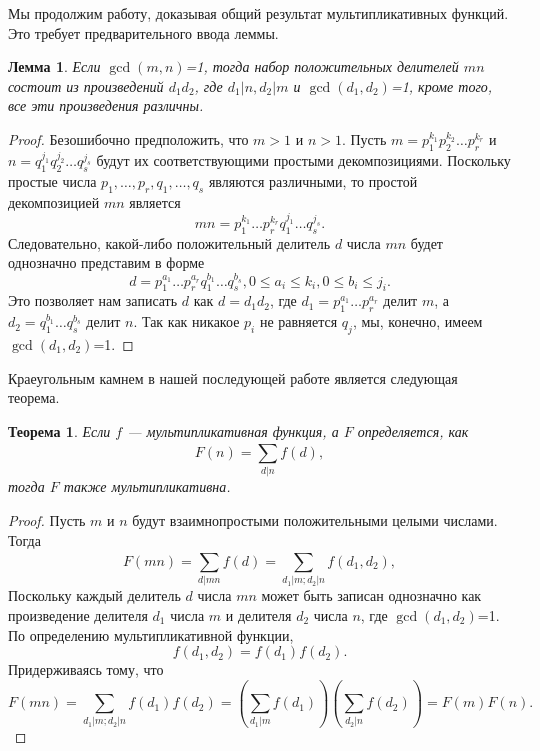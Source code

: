 \documentclass[11pt]{article}
\newtheorem{theorem}{Теорема}
\newtheorem{lemma}{Лемма}
\begin{document}
	Мы продолжим работу, доказывая общий результат мультипликативных функций. Это требует предварительного ввода леммы.
	
	\begin{lemma}
		Если $\gcd(m,n)$=1, тогда набор положительных делителей $mn$ состоит из произведений $d_1d_2$, где $d_1|n,d_2|m$ и $\gcd(d_1,d_2)$=1, кроме того, все эти произведения различны.
	\end{lemma}

	\begin{proof}
		Безошибочно предположить, что $m>1$ и $n>1$. Пусть $m=p_1^{k_1}p_2^{k_2}\ldots p_r^{k_r}$ и  $n=q_1^{j_1}q_2^{j_2}\ldots q_s^{j_s}$ будут их соответствующими простыми декомпозициями. Поскольку простые числа $p_1,\ldots,p_r,q_1,\ldots,q_s$ являются различными, то простой декомпозицией $mn$ является  
		\[
			mn=p_1^{k_1}\ldots p_r^{k_r}q_1^{j_1}\ldots q_s^{j_s}.
		\]
		Следовательно, какой-либо положительный делитель $d$ числа $mn$ будет однозначно представим в форме
		\[
			d=p_1^{a_1}\ldots p_r^{a_r}q_1^{b_1}\ldots q_s^{b_s}, 0\le a_i \le k_i, 0\le b_i\le j_i.
		\]
		Это позволяет нам записать $d$ как $d=d_1d_2$, где $d_1=p_1^{a_1}\ldots p_r^{a_r}$ делит $m$, а  $d_2=q_1^{b_1}\ldots q_s^{b_s}$ делит $n$. Так как никакое $p_i$ не равняется $q_j$, мы, конечно, имеем $\gcd(d_1,d_2)$=1. 
    \end{proof}

	Краеугольным камнем в нашей последующей работе является следующая теорема.
	
	\begin{theorem}
		Если $f$ --- мультипликативная функция, а $F$ определяется, как
		\[
			F(n)=\sum_{d|n}^{}f(d),
		\]
		тогда $F$ также мультипликативна.
	\end{theorem}

	\begin{proof}
		Пусть $m$ и $n$ будут взаимнопростыми положительными целыми числами. Тогда
		\[
			F(mn)=\sum_{d|mn}^{}f(d)=\sum_{d_1|m;d_2|n}^{}f(d_1,d_2),
		\]
		Поскольку каждый делитель $d$ числа $mn$ может быть записан однозначно как произведение делителя $d_1$ числа $m$ и делителя $d_2$ числа $n$, где $\gcd(d_1,d_2)$=1. По определению мультипликативной функции,
		\[
			f(d_1,d_2)=f(d_1)f(d_2).
		\]
		Придерживаясь тому, что
		\[
			F(mn)=\sum_{d_1|m;d_2|n}^{}f(d_1)f(d_2)=\left(\sum_{d_1|m}^{}f(d_1)\right)\left(\sum_{d_2|n}^{}f(d_2)\right)=F(m)F(n).
		\]
	\end{proof}
\end{document}
